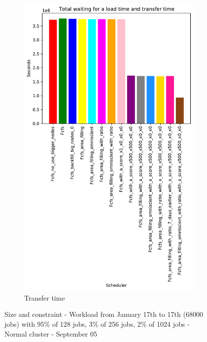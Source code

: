 \documentclass[a4paper]{article}
\begin{document}
\begin{figure}[H]
\begin{subfigure}[b]{0.4\linewidth}\centering\includegraphics[width=0.7\linewidth]{MBSS/plot/Results_Size_And_Data_2022-01-17->2022-01-17_V9532_Total_waiting_for_a_load_time_and_transfer_time_450_128_32_256_4_1024.pdf}\caption{Transfer time}\label{45}\end{subfigure}
\caption{Size and constraint - Workload from January 17th to 17th (68000 jobs) with 95\% of 128 jobs, 3\% of 256 jobs, 2\% of 1024 jobs - Normal cluster - September 05}\label{49}\end{figure}
\end{document}
